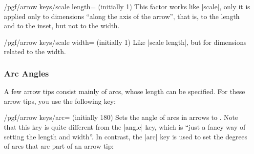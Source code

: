 \begin{key}{/pgf/arrow keys/scale length= (initially 1)}
    This factor works like |scale|, only it is applied only to dimensions
    ``along the axis of the arrow'', that is, to the length and to the inset,
    but not to the width.
\begin{codeexample}[preamble={\usetikzlibrary{arrows.meta}}]
\end{codeexample}
\end{key}

\begin{key}{/pgf/arrow keys/scale width= (initially 1)}
    Like |scale length|, but for dimensions related to the width.
\begin{codeexample}[preamble={\usetikzlibrary{arrows.meta}}]
\end{codeexample}
\end{key}


\subsubsection{Arc Angles}

A few arrow tips consist mainly of arcs, whose length can be specified. For
these arrow tips, you use the following key:

\begin{key}{/pgf/arrow keys/arc= (initially 180)}
    Sets the angle of arcs in arrows to . Note that this key is
    quite different from the |angle| key, which is ``just a fancy way of
    setting the length and width''. In contrast, the |arc| key is used to set
    the degrees of arcs that are part of an arrow tip:
\begin{codeexample}[preamble={\usetikzlibrary{arrows.meta}}]
\end{codeexample}
\end{key}


